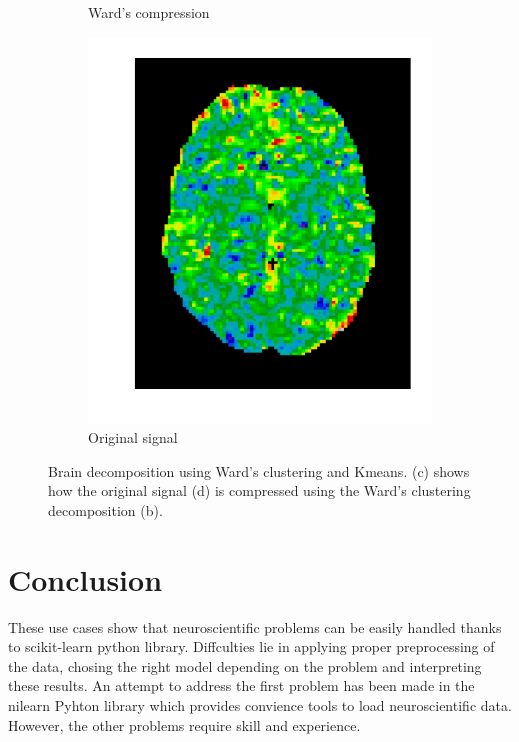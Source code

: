 \documentclass{frontiersSCNS} %
\begin{document}
\begin{figure}[hbtp]
\begin{center}
\begin{subfigure}[b]{.23\linewidth}
        \caption{Ward's compression}
      \end{subfigure}
      \begin{subfigure}[b]{.23\linewidth}
        \includegraphics[width=\linewidth]{img/clustering/original}
        \caption{Original signal}
      \end{subfigure}
  \end{center}
  \caption{Brain decomposition using Ward's clustering and Kmeans. (c) shows how the original
  signal (d) is compressed using the Ward's clustering decomposition (b).}
  \label{fig:clustering}
\end{figure}

\section{Conclusion}

These use cases show that neuroscientific problems can be easily handled thanks
to scikit-learn python library. Diffculties lie in applying proper preprocessing of
the data, chosing the right model depending on the problem and interpreting
these results. An attempt to
address the first problem has been made in the nilearn Pyhton library which
provides convience tools to load neuroscientific data. However, the other
problems require skill and experience.
\end{document}
